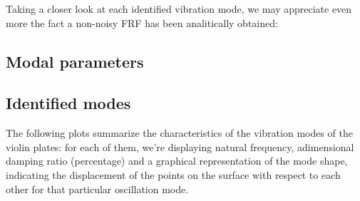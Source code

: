 \documentclass[a4paper,12pt,oneside]{article}
\begin{document}
Taking a closer look at each identified vibration mode, we may appreciate even more the fact a non-noisy FRF has been analitically obtained:

\subsection{Modal parameters}

\subsection{Identified modes}

The following plots summarize the characteristics of the vibration modes of the violin plates: for each of them, we're displaying natural frequency, adimensional damping ratio (percentage) and a graphical representation of the mode shape, indicating the displacement of the points on the surface with respect to each other for that particular oscillation mode.
\end{document}
